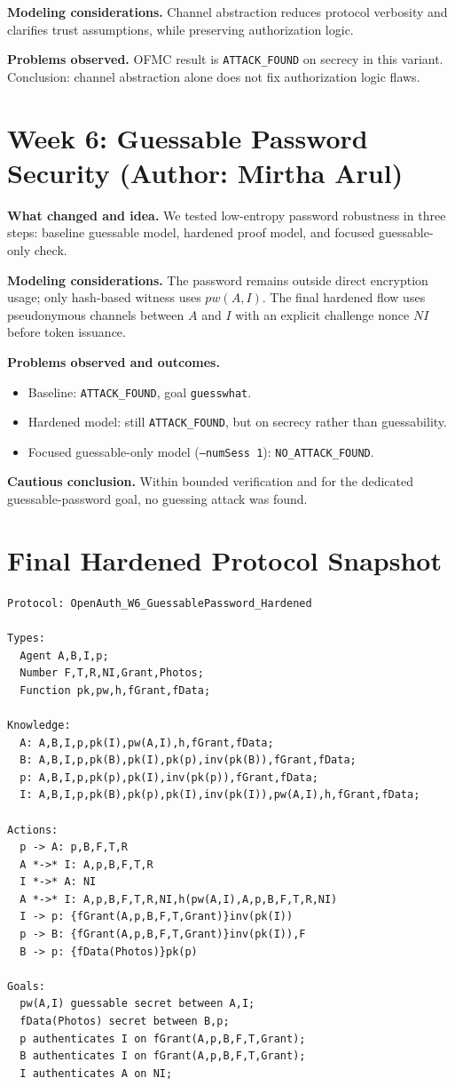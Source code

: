 \documentclass[11pt,a4paper]{article}
\begin{document}
\textbf{Modeling considerations.}
Channel abstraction reduces protocol verbosity and clarifies trust assumptions, while preserving authorization logic.

\textbf{Problems observed.}
OFMC result is \texttt{ATTACK\_FOUND} on secrecy in this variant.
Conclusion: channel abstraction alone does not fix authorization logic flaws.

\section{Week 6: Guessable Password Security (Author: Mirtha Arul)}
\textbf{What changed and idea.}
We tested low-entropy password robustness in three steps:
baseline guessable model, hardened proof model, and focused guessable-only check.

\textbf{Modeling considerations.}
The password remains outside direct encryption usage; only hash-based witness uses $pw(A,I)$.
The final hardened flow uses pseudonymous channels between $A$ and $I$ with an explicit challenge nonce $NI$ before token issuance.

\textbf{Problems observed and outcomes.}
\begin{itemize}[leftmargin=1.2em]
  \item Baseline: \texttt{ATTACK\_FOUND}, goal \texttt{guesswhat}.
  \item Hardened model: still \texttt{ATTACK\_FOUND}, but on secrecy rather than guessability.
  \item Focused guessable-only model (\texttt{--numSess 1}): \texttt{NO\_ATTACK\_FOUND}.
\end{itemize}

\textbf{Cautious conclusion.}
Within bounded verification and for the dedicated guessable-password goal, no guessing attack was found.

\section{Final Hardened Protocol Snapshot}
\begin{lstlisting}
Protocol: OpenAuth_W6_GuessablePassword_Hardened

Types:
  Agent A,B,I,p;
  Number F,T,R,NI,Grant,Photos;
  Function pk,pw,h,fGrant,fData;

Knowledge:
  A: A,B,I,p,pk(I),pw(A,I),h,fGrant,fData;
  B: A,B,I,p,pk(B),pk(I),pk(p),inv(pk(B)),fGrant,fData;
  p: A,B,I,p,pk(p),pk(I),inv(pk(p)),fGrant,fData;
  I: A,B,I,p,pk(B),pk(p),pk(I),inv(pk(I)),pw(A,I),h,fGrant,fData;

Actions:
  p -> A: p,B,F,T,R
  A *->* I: A,p,B,F,T,R
  I *->* A: NI
  A *->* I: A,p,B,F,T,R,NI,h(pw(A,I),A,p,B,F,T,R,NI)
  I -> p: {fGrant(A,p,B,F,T,Grant)}inv(pk(I))
  p -> B: {fGrant(A,p,B,F,T,Grant)}inv(pk(I)),F
  B -> p: {fData(Photos)}pk(p)

Goals:
  pw(A,I) guessable secret between A,I;
  fData(Photos) secret between B,p;
  p authenticates I on fGrant(A,p,B,F,T,Grant);
  B authenticates I on fGrant(A,p,B,F,T,Grant);
  I authenticates A on NI;
\end{lstlisting}
\end{document}
